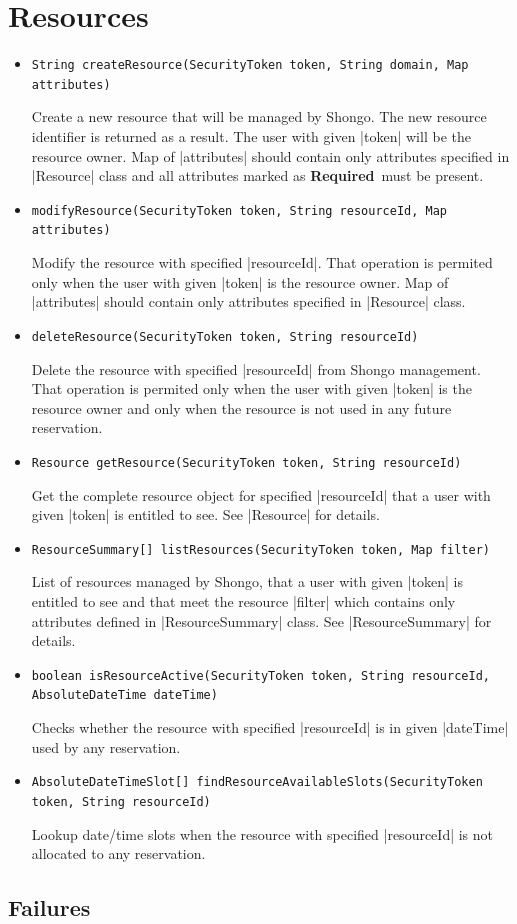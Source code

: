 \documentclass[a4paper]{report}
\newenvironment{Api}{\begin{itemize}}{\end{itemize}}
\newcommand{\ApiCode}[1]{\lstinline[style=styleApi]|#1|}
\newcommand{\ApiItem}[1]{\item #1 %

}
\newcommand{\ApiCmd}[1]{\ApiItem{\ApiCode{#1}}}
\newcommand{\ApiRequired}{{\color{blue!50!black}\textbf{Required}}}
\begin{document}
\section{Resources}

\begin{Api}

\ApiCmd{String createResource(SecurityToken token, String domain, Map attributes)}
Create a new resource that will be managed by Shongo. The new resource identifier is returned as a result. The user with given |token| will be the resource owner. Map of |attributes| should contain only attributes specified in |Resource| class and all attributes marked as \ApiRequired\ must be present.

\ApiCmd{modifyResource(SecurityToken token, String resourceId, Map attributes)}
Modify the resource with specified |resourceId|. That operation is permited only when the user with given |token| is the resource owner. Map of |attributes| should contain only attributes specified in |Resource| class.

\ApiCmd{deleteResource(SecurityToken token, String resourceId)}
Delete the resource with specified |resourceId| from Shongo management. That operation is permited only when the user with given |token| is the resource owner and only when the resource is not used in any future reservation.

\ApiCmd{Resource getResource(SecurityToken token, String resourceId)}
Get the complete resource object for specified |resourceId| that a user with given |token| is entitled to see. See |Resource| for details.

\ApiCmd{ResourceSummary[] listResources(SecurityToken token, Map filter)}
List of resources managed by Shongo, that a user with given |token| is entitled to see and that meet the resource |filter| which contains only attributes defined in |ResourceSummary| class. See |ResourceSummary| for details.

\ApiCmd{boolean isResourceActive(SecurityToken token, String resourceId, AbsoluteDateTime dateTime)}
Checks whether the resource with specified |resourceId| is in given |dateTime| used by any reservation.

\ApiCmd{AbsoluteDateTimeSlot[] findResourceAvailableSlots(SecurityToken token, String resourceId)}
Lookup date/time slots when the resource with specified |resourceId| is not allocated to any reservation.


\end{Api}

\subsection{Failures}
\end{document}
